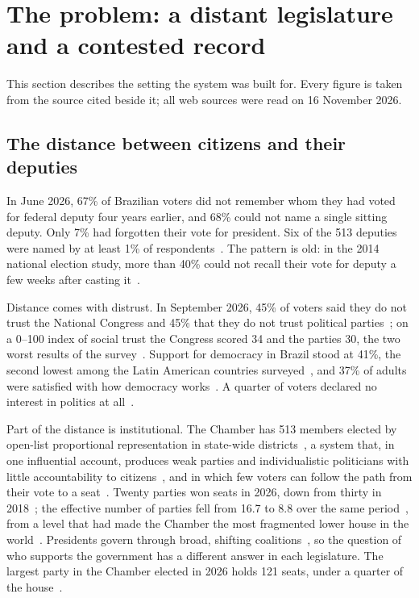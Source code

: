 \section{The problem: a distant legislature and a contested record}
\label{sec:context}

This section describes the setting the system was built for. Every figure is taken from the source cited beside it; all web sources were read on 16 November 2026.

\subsection{The distance between citizens and their deputies}

In June 2026, 67\% of Brazilian voters did not remember whom they had voted for federal deputy four years earlier, and 68\% could not name a single sitting deputy. Only 7\% had forgotten their vote for president. Six of the 513 deputies were named by at least 1\% of respondents~\citep{folha2026votememory}. The pattern is old: in the 2014 national election study, more than 40\% could not recall their vote for deputy a few weeks after casting it~\citep{fapesp2015eseb}.

Distance comes with distrust. In September 2026, 45\% of voters said they do not trust the National Congress and 45\% that they do not trust political parties~\citep{datafolha2026trust}; on a 0--100 index of social trust the Congress scored 34 and the parties 30, the two worst results of the survey~\citep{ipsos2026ics}. Support for democracy in Brazil stood at 41\%, the second lowest among the Latin American countries surveyed~\citep{latinobarometro2026}, and 37\% of adults were satisfied with how democracy works~\citep{pew2026brazil}. A quarter of voters declared no interest in politics at all~\citep{datafolha2026interest}.

Part of the distance is institutional. The Chamber has 513 members elected by open-list proportional representation in state-wide districts~\citep{tse2026systems}, a system that, in one influential account, produces weak parties and individualistic politicians with little accountability to citizens~\citep{ames2001deadlock}, and in which few voters can follow the path from their vote to a seat~\citep{nicolau2017representantes}. Twenty parties won seats in 2026, down from thirty in 2018~\citep{folha2026fragmentation}; the effective number of parties fell from 16.7 to 8.8 over the same period~\citep{tejadas2026nep}, from a level that had made the Chamber the most fragmented lower house in the world~\citep{poder3602023fragmentation}. Presidents govern through broad, shifting coalitions~\citep{abranches1988presidencialismo}, so the question of who supports the government has a different answer in each legislature. The largest party in the Chamber elected in 2026 holds 121 seats, under a quarter of the house~\citep{cnn2026seats}.


